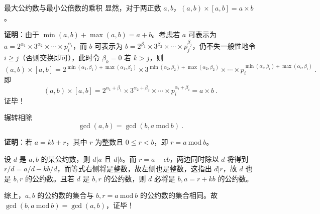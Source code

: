 \begin{theorem}{最大公约数与最小公倍数的乘积}
显然，对于两正数 $a, b$，$(a, b) \times [a, b] = a \times b$。
\end{theorem}
\textbf{证明}：由于 $\min(a, b) + \max(a, b) =a + b$。考虑若 $a$ 可表示为 $a = 2^{\alpha_1} \times 3^{\alpha_2} \times \cdots \times p_i^{\alpha_i}$，而 $b$ 可表示为 $b = 2^{\beta_1} \times 3^{\beta_2} \times \cdots \times p_j^{\beta_j}$，仍不失一般性地令 $i \ge j$（否则交换即可），此时令 $\beta_k = 0$ 若 $k > j$，则
\begin{equation}
(a, b) \times  [a, b] = 2^{\min(\alpha_1, \beta_1) + \max(\alpha_1, \beta_2)} \times 3^{\min(\alpha_2, \beta_2) + \max(\alpha_2, \beta_2)} \times \cdots \times p_i^{\min(\alpha_i, \beta_i) + \max(\alpha_i, \beta_i)} ~.
\end{equation}
即
\begin{equation}
(a,b) \times [a, b] = 2^{\alpha_1 + \beta_1} \times 3^{\alpha_2 + \beta_2} \times \cdots \times p_i^{\alpha_i + \beta_i} = a \times b ~.
\end{equation}
证毕！

\begin{theorem}{辗转相除}\label{the_gcdlcm_1}
\begin{equation}
\gcd(a, b) = \gcd(b , a~ \text{mod} ~b)  ~.
\end{equation}
\end{theorem}
\textbf{证明}：若 $a = kb + r$，其中 $r$ 为整数且 $0 \le r < b$，即 $r = a ~\text{mod}~ b$。

设 $d$ 是 $a, b$ 的某公约数，则 $d|a$ 且 $d|b$。而 $r = a - cb$，两边同时除以 $d$ 将得到 $r/d = a/d - kb/d$，而等式右侧将是整数，故左侧也是整数，这指出 $d | r$，故 $d$ 也是 $b, r$ 的公约数。且若 $d$ 是 $b, r$ 的公约数，则 $d$ 必将是 $b, a=r+kb$ 的公约数。

综上，$a, b$ 的公约数的集合与 $b, r=a ~\text{mod}~ b$ 的公约数的集合相同。故 $\gcd(b, a~\text{mod}~b) = \gcd(a, b)$，证毕！